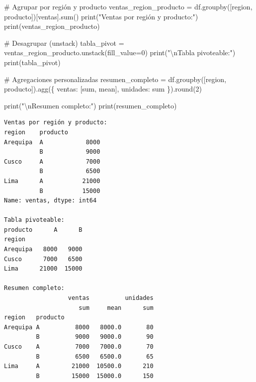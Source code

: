 \documentclass[
  doc,
  floatsintext,
  longtable,
  a4paper,
  nolmodern,
  notxfonts,
  notimes,
  12pt,
  colorlinks=true,linkcolor=blue,citecolor=blue,urlcolor=blue]{apa7}
\newenvironment{Shaded}{\begin{snugshade}}{\end{snugshade}}
\newcommand{\BuiltInTok}[1]{\textcolor[rgb]{0.00,0.23,0.31}{#1}}
\newcommand{\CharTok}[1]{\textcolor[rgb]{0.13,0.47,0.30}{#1}}
\newcommand{\CommentTok}[1]{\textcolor[rgb]{0.37,0.37,0.37}{#1}}
\newcommand{\DecValTok}[1]{\textcolor[rgb]{0.68,0.00,0.00}{#1}}
\newcommand{\NormalTok}[1]{\textcolor[rgb]{0.00,0.23,0.31}{#1}}
\newcommand{\OperatorTok}[1]{\textcolor[rgb]{0.37,0.37,0.37}{#1}}
\newcommand{\StringTok}[1]{\textcolor[rgb]{0.13,0.47,0.30}{#1}}
\begin{document}
\begin{Shaded}
\begin{Highlighting}[]
\CommentTok{\# Agrupar por región y producto}
\NormalTok{ventas\_region\_producto }\OperatorTok{=}\NormalTok{ df.groupby([}\StringTok{\textquotesingle{}region\textquotesingle{}}\NormalTok{, }\StringTok{\textquotesingle{}producto\textquotesingle{}}\NormalTok{])[}\StringTok{\textquotesingle{}ventas\textquotesingle{}}\NormalTok{].}\BuiltInTok{sum}\NormalTok{()}
\BuiltInTok{print}\NormalTok{(}\StringTok{"Ventas por región y producto:"}\NormalTok{)}
\BuiltInTok{print}\NormalTok{(ventas\_region\_producto)}

\CommentTok{\# Desagrupar (unstack)}
\NormalTok{tabla\_pivot }\OperatorTok{=}\NormalTok{ ventas\_region\_producto.unstack(fill\_value}\OperatorTok{=}\DecValTok{0}\NormalTok{)}
\BuiltInTok{print}\NormalTok{(}\StringTok{"}\CharTok{\textbackslash{}n}\StringTok{Tabla pivoteable:"}\NormalTok{)}
\BuiltInTok{print}\NormalTok{(tabla\_pivot)}

\CommentTok{\# Agregaciones personalizadas}
\NormalTok{resumen\_completo }\OperatorTok{=}\NormalTok{ df.groupby([}\StringTok{\textquotesingle{}region\textquotesingle{}}\NormalTok{, }\StringTok{\textquotesingle{}producto\textquotesingle{}}\NormalTok{]).agg(\{}
    \StringTok{\textquotesingle{}ventas\textquotesingle{}}\NormalTok{: [}\StringTok{\textquotesingle{}sum\textquotesingle{}}\NormalTok{, }\StringTok{\textquotesingle{}mean\textquotesingle{}}\NormalTok{],}
    \StringTok{\textquotesingle{}unidades\textquotesingle{}}\NormalTok{: }\StringTok{\textquotesingle{}sum\textquotesingle{}}
\NormalTok{\}).}\BuiltInTok{round}\NormalTok{(}\DecValTok{2}\NormalTok{)}

\BuiltInTok{print}\NormalTok{(}\StringTok{"}\CharTok{\textbackslash{}n}\StringTok{Resumen completo:"}\NormalTok{)}
\BuiltInTok{print}\NormalTok{(resumen\_completo)}
\end{Highlighting}
\end{Shaded}

\begin{verbatim}
Ventas por región y producto:
region    producto
Arequipa  A            8000
          B            9000
Cusco     A            7000
          B            6500
Lima      A           21000
          B           15000
Name: ventas, dtype: int64

Tabla pivoteable:
producto      A      B
region                
Arequipa   8000   9000
Cusco      7000   6500
Lima      21000  15000

Resumen completo:
                  ventas          unidades
                     sum     mean      sum
region   producto                         
Arequipa A          8000   8000.0       80
         B          9000   9000.0       90
Cusco    A          7000   7000.0       70
         B          6500   6500.0       65
Lima     A         21000  10500.0      210
         B         15000  15000.0      150
\end{verbatim}
\end{document}
